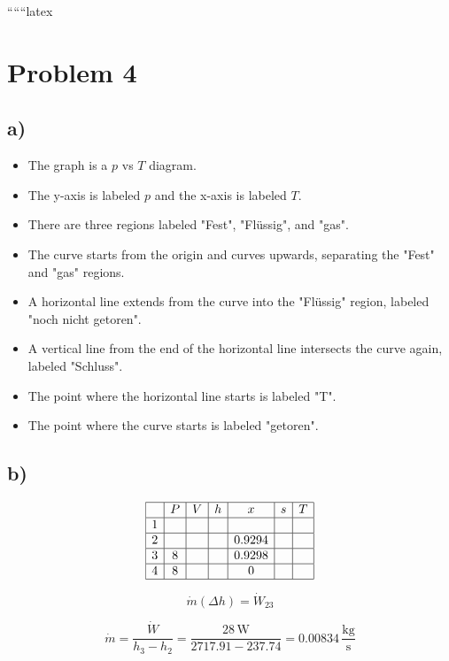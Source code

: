 
``````latex


\section*{Problem 4}

\subsection*{a)}

\begin{itemize}
    \item The graph is a $p$ vs $T$ diagram.
    \item The y-axis is labeled $p$ and the x-axis is labeled $T$.
    \item There are three regions labeled "Fest", "Flüssig", and "gas".
    \item The curve starts from the origin and curves upwards, separating the "Fest" and "gas" regions.
    \item A horizontal line extends from the curve into the "Flüssig" region, labeled "noch nicht getoren".
    \item A vertical line from the end of the horizontal line intersects the curve again, labeled "Schluss".
    \item The point where the horizontal line starts is labeled "T".
    \item The point where the curve starts is labeled "getoren".
\end{itemize}

\subsection*{b)}

\[
\begin{array}{|c|c|c|c|c|c|c|}
\hline
 & P & V & h & x & s & T \\
\hline
1 &  &  &  &  &  &  \\
\hline
2 &  &  &  & 0.9294 &  &  \\
\hline
3 & 8 &  &  & 0.9298 &  &  \\
\hline
4 & 8 &  &  & 0 &  &  \\
\hline
\end{array}
\]

\[
\dot{m} (\Delta h) = \dot{W}_{23}
\]

\[
\dot{m} = \frac{\dot{W}}{h_3 - h_2} = \frac{28 \, \text{W}}{2717.91 - 237.74} = 0.00834 \, \frac{\text{kg}}{\text{s}}
\]

